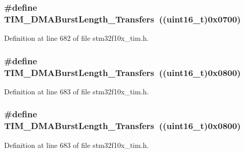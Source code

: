 \subsubsection[{\texorpdfstring{T\+I\+M\+\_\+\+D\+M\+A\+Burst\+Length\+\_\+8\+Transfers}{TIM_DMABurstLength_8Transfers}}]{\setlength{\rightskip}{0pt plus 5cm}\#define T\+I\+M\+\_\+\+D\+M\+A\+Burst\+Length\+\_\+Transfers~(({\bf uint16\+\_\+t})0x0700)}\hypertarget{group___t_i_m___d_m_a___burst___length_ga8a760d7114425596736b0ecdbe5fdea6}{}\label{group___t_i_m___d_m_a___burst___length_ga8a760d7114425596736b0ecdbe5fdea6}


Definition at line 682 of file stm32f10x\+\_\+tim.\+h.

\subsubsection[{\texorpdfstring{T\+I\+M\+\_\+\+D\+M\+A\+Burst\+Length\+\_\+9\+Transfers}{TIM_DMABurstLength_9Transfers}}]{\setlength{\rightskip}{0pt plus 5cm}\#define T\+I\+M\+\_\+\+D\+M\+A\+Burst\+Length\+\_\+Transfers~(({\bf uint16\+\_\+t})0x0800)}\hypertarget{group___t_i_m___d_m_a___burst___length_ga98b208205c133557a9d67a0921559a66}{}\label{group___t_i_m___d_m_a___burst___length_ga98b208205c133557a9d67a0921559a66}


Definition at line 683 of file stm32f10x\+\_\+tim.\+h.

\subsubsection[{\texorpdfstring{T\+I\+M\+\_\+\+D\+M\+A\+Burst\+Length\+\_\+9\+Transfers}{TIM_DMABurstLength_9Transfers}}]{\setlength{\rightskip}{0pt plus 5cm}\#define T\+I\+M\+\_\+\+D\+M\+A\+Burst\+Length\+\_\+Transfers~(({\bf uint16\+\_\+t})0x0800)}\hypertarget{group___t_i_m___d_m_a___burst___length_ga98b208205c133557a9d67a0921559a66}{}\label{group___t_i_m___d_m_a___burst___length_ga98b208205c133557a9d67a0921559a66}


Definition at line 683 of file stm32f10x\+\_\+tim.\+h.

